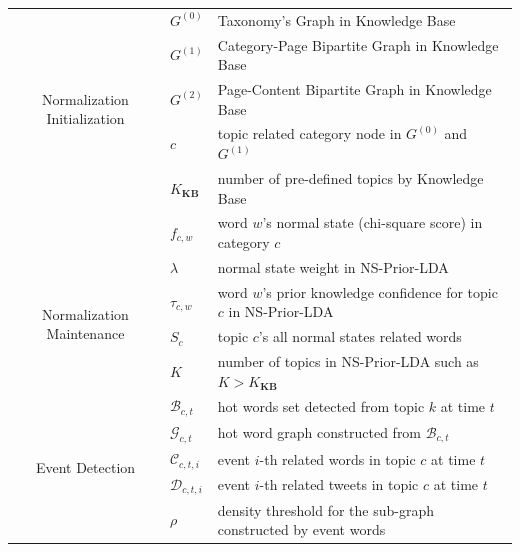 \documentclass[conference,compsoc]{IEEEtran}
\begin{document}
\begin{table}
\begin{tabular}{|c|p{}|p{}|} \hline
\multirow{5}{0.18\columnwidth}{Normalization Initialization} & \(G^{(0)}\) & Taxonomy's Graph in Knowledge Base\\ \cline{2-3}
& \(G^{(1)}\) & Category-Page Bipartite Graph in Knowledge Base\\ \cline{2-3}
& \(G^{(2)}\) & Page-Content Bipartite Graph in Knowledge Base\\ \cline{2-3}
& \(c\) & topic related category node in \(G^{(0)}\) and \(G^{(1)}\) \\ \cline{2-3}
& \(K_{\bm{KB}}\) & number of pre-defined topics by Knowledge Base \\ \cline{2-3}
& \(f_{c,w}\) & word \(w\)'s normal state (chi-square score) in category \(c\) \\ \hline
\multirow{4}{0.18\columnwidth}{Normalization Maintenance} & \(\lambda\) & normal state weight in  NS-Prior-LDA\\ \cline{2-3}
& \(\tau_{c,w}\) & word \(w\)'s prior knowledge confidence for topic \(c\) in NS-Prior-LDA\\ \cline{2-3}
& \(S_c\) & topic \(c\)'s all normal states related words \\ \cline{2-3}
& \(K\) & number of topics in NS-Prior-LDA such as \(K>K_{\bm{KB}}\)\\ \hline
\multirow{5}{0.18\columnwidth}{Event Detection} & \(\mathcal{B}_{c, t}\)  & hot words set detected from topic \(k\) at time \(t\)  \\ \cline{2-3}
& \(\mathcal{G}_{c, t}\)  & hot word graph constructed from \(\mathcal{B}_{c, t}\) \\ \cline{2-3}
& \(\mathcal{C}_{c,t,i}\) & event \(i\)-th related words in topic \(c\) at time \(t\) \\ \cline{2-3}
& \(\mathcal{D}_{c,t,i}\) & event \(i\)-th related tweets in topic \(c\) at time \(t\) \\ \cline{2-3}
& \(\rho\) & density threshold for the sub-graph constructed by event words  \\ \hline

\end{tabular}
\label{symbolsInModel}
\end{table}
\end{document}

